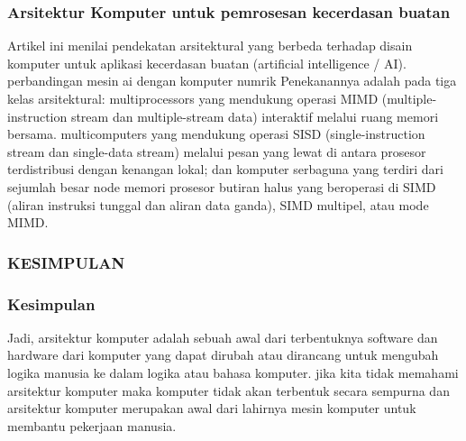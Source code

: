 	\subsubsection{Arsitektur Komputer untuk pemrosesan kecerdasan buatan}
	Artikel ini menilai pendekatan arsitektural yang berbeda terhadap disain komputer untuk aplikasi kecerdasan buatan (artificial intelligence / AI).
	perbandingan mesin ai dengan komputer numrik Penekanannya adalah pada tiga kelas arsitektural: multiprocessors yang mendukung operasi MIMD (multiple-instruction stream dan multiple-stream data) interaktif melalui ruang memori bersama.
	multicomputers yang mendukung operasi SISD (single-instruction stream dan single-data stream) melalui pesan yang lewat di antara prosesor terdistribusi dengan kenangan lokal; dan komputer serbaguna yang terdiri dari sejumlah besar node memori prosesor butiran halus yang beroperasi di SIMD (aliran instruksi tunggal dan aliran data ganda), SIMD multipel, atau mode MIMD.\cite{hwang1987computer}
	
	\subsubsection{KESIMPULAN}
	\subsubsection{Kesimpulan}
	Jadi, arsitektur komputer adalah sebuah awal dari terbentuknya software dan hardware dari komputer yang dapat dirubah atau dirancang untuk mengubah logika manusia ke dalam logika atau bahasa komputer.
	jika kita tidak memahami arsitektur komputer maka komputer tidak akan terbentuk secara sempurna dan arsitektur komputer merupakan awal dari lahirnya mesin komputer untuk membantu pekerjaan manusia.
